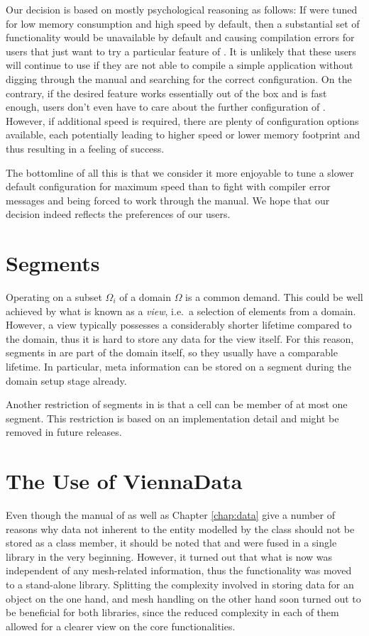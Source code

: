  Our decision is based on mostly psychological reasoning as follows: If {\ViennaGrid} were tuned for low memory consumption and high speed by default, then a substantial set of functionality would be unavailable by default and causing compilation errors for users that just want to try a particular feature of {\ViennaGrid}. 
 It is unlikely that these users will continue to use {\ViennaGrid} if they are not able to compile a simple application without digging through the manual and searching for the correct configuration. On the contrary, if the desired feature works essentially out of the box and is fast enough, users don't even have to care about the further configuration of {\ViennaGrid}. However, if additional speed is required, there are plenty of configuration options available, each potentially leading to higher speed or lower memory footprint and thus resulting in a feeling of success. 

 The bottomline of all this is that we consider it more enjoyable to tune a slower default configuration for maximum speed than to fight with compiler error messages and being forced to work through the manual. We hope that our decision indeed reflects the preferences of our users.


 \section{Segments}
 Operating on a subset $\Omega_i$ of a domain $\Omega$ is a common demand. This could be well achieved by what is known as a \emph{view}, i.e.~a selection of elements from a domain. However, a view typically possesses a considerably shorter lifetime compared to the domain, thus it is hard to store any data for the view itself.
 For this reason, segments in {\ViennaGrid} are part of the domain itself, so they usually have a comparable lifetime.
 In particular, meta information can be stored on a segment during the domain setup stage already.

 Another restriction of segments in {\ViennaGrid} is that a cell can be member of at most one segment.
 This restriction is based on an implementation detail and might be removed in future releases.

 \section{The Use of ViennaData}
 Even though the manual of {\ViennaData} as well as Chapter \ref{chap:data} give a number of reasons why data not inherent to the entity modelled by the class should not be stored as a class member, it should be noted that {\ViennaData} and {\ViennaGrid} were fused in a single library in the very beginning. 
 However, it turned out that what is now {\ViennaData} was independent of any mesh-related information, thus the functionality was moved to a stand-alone library.
 Splitting the complexity involved in storing data for an object on the one hand, and mesh handling on the other hand soon turned out to be beneficial for both libraries, since the reduced complexity in each of them allowed for a clearer view on the core functionalities.


